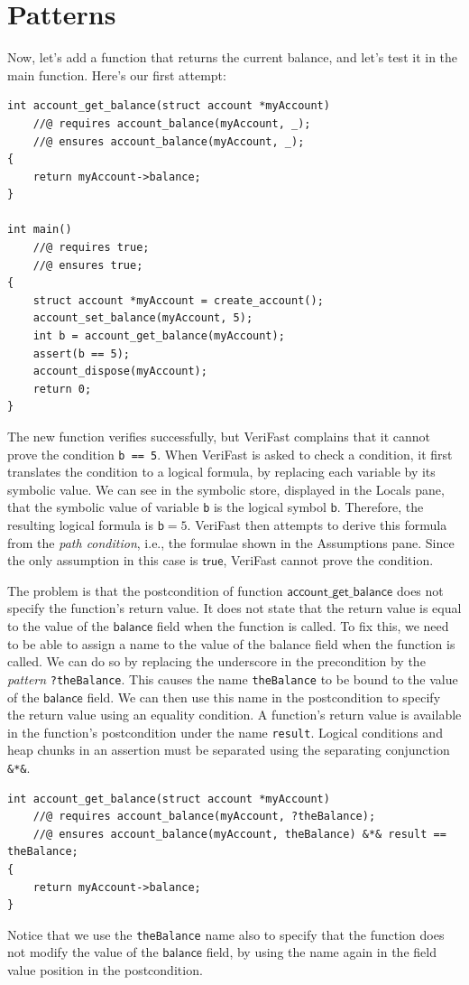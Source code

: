 \documentclass{article}
\begin{document}
\section{Patterns}

Now, let's add a function that returns the current balance, and
let's test it in the main function. Here's our first attempt:

\begin{lstlisting}
int account_get_balance(struct account *myAccount)
    //@ requires account_balance(myAccount, _);
    //@ ensures account_balance(myAccount, _);
{
    return myAccount->balance;
}

int main()
    //@ requires true;
    //@ ensures true;
{
    struct account *myAccount = create_account();
    account_set_balance(myAccount, 5);
    int b = account_get_balance(myAccount);
    assert(b == 5);
    account_dispose(myAccount);
    return 0;
}
\end{lstlisting}

The new function verifies successfully, but VeriFast complains
that it cannot prove the condition \lstinline!b == 5!. When
VeriFast is asked to check a condition, it first translates the
condition to a logical formula, by replacing each variable by
its symbolic value. We can see in the symbolic store, displayed
in the Locals pane, that the symbolic value of variable
\lstinline|b| is the logical symbol $\mathsf{b}$. Therefore, the
resulting logical formula is $\mathsf{b} = 5$. VeriFast then
attempts to derive this formula from the \emph{path condition},
i.e., the formulae shown in the Assumptions pane. Since the
only assumption in this case is $\mathsf{true}$, VeriFast
cannot prove the condition.

The problem is that the postcondition of function
$\mathsf{account\_get\_balance}$ does not specify the
function's return value. It does not state that the return
value is equal to the value of the $\mathsf{balance}$ field
when the function is called. To fix this, we need to be able to
assign a name to the value of the balance field when the
function is called. We can do so by replacing the underscore in
the precondition by the \emph{pattern} \lstinline!?theBalance!.
This causes the name \lstinline!theBalance! to be bound to the
value of the $\mathsf{balance}$ field. We can then use this
name in the postcondition to specify the return value using an
equality condition. A function's return value is available in
the function's postcondition under the name \lstinline!result!.
Logical conditions and heap chunks in an assertion must be
separated using the separating conjunction \lstinline!&*&!.
\begin{lstlisting}
int account_get_balance(struct account *myAccount)
    //@ requires account_balance(myAccount, ?theBalance);
    //@ ensures account_balance(myAccount, theBalance) &*& result == theBalance;
{
    return myAccount->balance;
}
\end{lstlisting}
Notice that we use the \lstinline!theBalance! name also to
specify that the function does not modify the value of the
$\mathsf{balance}$ field, by using the name again in the field
value position in the postcondition.
\end{document}
